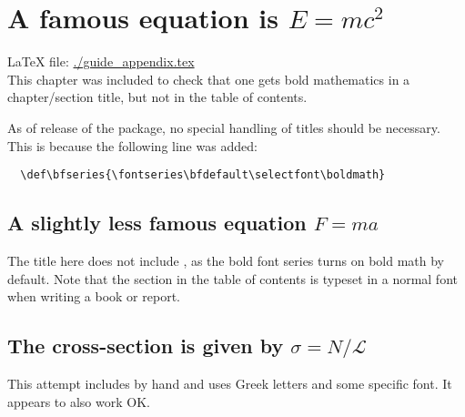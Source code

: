\chapter{A famous equation is $E = mc^{2}$}
\label{sec:emc2}

\LaTeX{} file: \url{./guide_appendix.tex}\\[1ex]
\noindent
This chapter was included to check that one gets bold mathematics in
a chapter/section title, but not in the table of contents.

As of release of the  package, no special handling of
titles should be necessary. This is because the following line was added:
\begin{verbatim}
  \def\bfseries{\fontseries\bfdefault\selectfont\boldmath}
\end{verbatim}

\section{A slightly less famous equation $F = m a$}
\label{sec:fma}

The title here does not include , as the bold font series turns on bold math by default.
Note that the
section in the table of contents is typeset in a normal font when
writing a book or report.


\section[The cross-section is given by $\sigma = N / \mathcal{L}$]%
        {The cross-section is given by $\sigma = N / \mathcal{L}$}
\label{sec:sig}

This attempt includes  by hand and uses Greek letters and some specific font.
It appears to also work OK.


